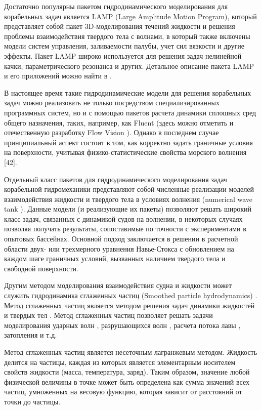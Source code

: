 Достаточно популярны пакетом гидродинамического моделирования для корабельных задач является LAMP (Large Amplitude Motion Program), который представляет собой пакет 3D-моделирования течений жидкости и решения проблемы взаимодействия твердого тела с волнами, в который также включены модели систем управления, заливаемости палубы, учет сил вязкости и другие эффекты. Пакет LAMP широко используется для решения задач нелинейной качки, параметрического резонанса и других. Детальное описание пакета LAMP и его приложений можно найти в \citep{dk39}\citep{dk40}. 

В настоящее время такие гидродинамические модели для решения корабельных задач можно реализовать не только посредством специализированных программных систем, но и с помощью пакетов расчета динамики сплошных сред общего назначения, таких, например, как Fluent (здесь можно отметить и отечественную разработку Flow Vision \citep{dk41}). Однако в последнем случае принципиальный аспект состоит в том, как корректно задать граничные условия на поверхности, учитывая физико-статистические свойства морского волнения [42].

Отдельный класс пакетов для гидродинамического моделирования задач корабельной гидромеханики представляют собой численные реализации моделей взаимодействия жидкости и твердого тела в условиях волнения (numerical wave tank \citep{dk41}\citep{dk42}\citep{dk43}\citep{dk44}). Данные модели (и реализующие их пакеты) позволяют решать широкий класс задач, связанных с динамикой судов на волнении, в некоторых случаях позволяя получать результаты, сопоставимые по точности с экспериментами в опытовых бассейнах. Основной подход заключается в решении в расчетной области двух- или трехмерного уравнения Навье-Стокса с обновлением на каждом шаге граничных условий, вызванных наличием твердого тела и свободной поверхности.

Другим методом моделирования взаимодействия судна и жидкости может служить гидродинамика сглаженных частиц (Smoothed particle hydrodynamics) \citep{dk45}. Метод сглаженных частиц является методом решения задач динамики жидкостей и твердых тел \citep{dk46}. Метод сглаженных частиц позволяет решать задачи моделирования ударных волн \citep{dk47}, разрушающихся волн \citep{dk48}, расчета потока лавы \citep{dk49}, затопления \citep{dk50} и т.д.

Метод сглаженных частиц является несеточным лагранжевым методом. Жидкость делится на частицы, каждая из которых является элементарным носителем свойств жидкости (масса, температура, заряд). Таким образом, значение любой физической величины в точке может быть определена как сумма значений всех частиц, умноженных на весовую функцию, которая зависит от расстояний от точки до частицы.
